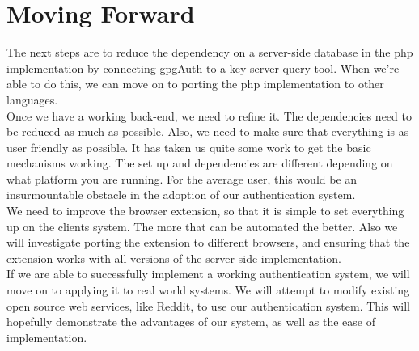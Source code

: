 \documentclass[11pt]{article}
\begin{document}
\section{Moving Forward} \label{sec:future}
The next steps are to reduce the dependency on a server-side database in the php implementation by connecting gpgAuth to a key-server query tool.  When we're able to do this, we can move on to porting the php implementation to other languages.\\
Once we have a working back-end, we need to refine it. The dependencies need to be reduced as much as possible. Also, we need to make sure that everything is as user friendly as possible. It has taken us quite some work to get the basic mechanisms working. The set up and dependencies are different depending on what platform you are running. For the average user, this would be an insurmountable obstacle in the adoption of our authentication system.\\
We need to improve the browser extension, so that it is simple to set everything up on the clients system. The more that can be automated the better. Also we will investigate porting the extension to different browsers, and ensuring that the extension works with all versions of the server side implementation.\\
If we are able to successfully implement a working authentication system, we will move on to applying it to real world systems. We will attempt to modify existing open source web services, like Reddit, to use our authentication system. This will hopefully demonstrate the advantages of our system, as well as the ease of implementation.


{}
\end{document}
